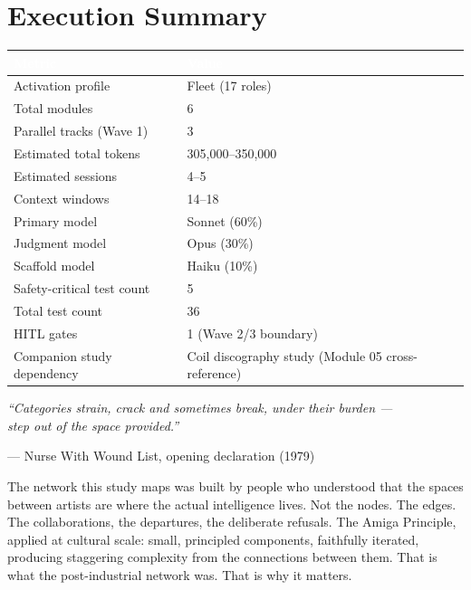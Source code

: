 \documentclass[11pt,letterpaper]{article}
\newcommand{\tableheader}[1]{\textbf{\sffamily\textcolor{white}{#1}}}
\begin{document}
\section{Execution Summary}

\begin{center}
\begin{tabularx}{\textwidth}{L{4cm}X}
\toprule
{}
\tableheader{Metric} & \tableheader{Value} \\
\midrule
Activation profile & Fleet (17 roles) \\
Total modules & 6 \\
Parallel tracks (Wave 1) & 3 \\
Estimated total tokens & 305,000--350,000 \\
Estimated sessions & 4--5 \\
Context windows & 14--18 \\
Primary model & Sonnet (60\%) \\
Judgment model & Opus (30\%) \\
Scaffold model & Haiku (10\%) \\
Safety-critical test count & 5 \\
Total test count & 36 \\
HITL gates & 1 (Wave 2/3 boundary) \\
Companion study dependency & Coil discography study (Module 05 cross-reference) \\
\bottomrule
\end{tabularx}
\end{center}

\vspace{2em}

\begin{quotebox}
\textit{``Categories strain, crack and sometimes break, under their burden ---\\
step out of the space provided.''}

\smallskip
--- Nurse With Wound List, opening declaration (1979)

\smallskip
The network this study maps was built by people who understood that the spaces between artists
are where the actual intelligence lives. Not the nodes. The edges. The collaborations, the
departures, the deliberate refusals. The Amiga Principle, applied at cultural scale: small,
principled components, faithfully iterated, producing staggering complexity from the
connections between them. That is what the post-industrial network was. That is why it matters.
\end{quotebox}
\end{document}
